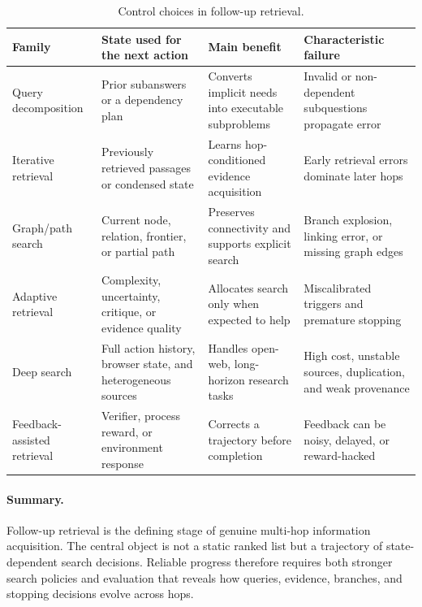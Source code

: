 \begin{table}[tbp]
\centering
\caption{Control choices in follow-up retrieval.}
\label{tab:followup_control}
\small
\begin{tabularx}{\textwidth}{@{}p{2.8cm}p{3.2cm}Y Y@{}}
\toprule
Family & State used for the next action & Main benefit & Characteristic failure \\
\midrule
Query decomposition & Prior subanswers or a dependency plan & Converts implicit needs into executable subproblems & Invalid or non-dependent subquestions propagate error \\
Iterative retrieval & Previously retrieved passages or condensed state & Learns hop-conditioned evidence acquisition & Early retrieval errors dominate later hops \\
Graph/path search & Current node, relation, frontier, or partial path & Preserves connectivity and supports explicit search & Branch explosion, linking error, or missing graph edges \\
Adaptive retrieval & Complexity, uncertainty, critique, or evidence quality & Allocates search only when expected to help & Miscalibrated triggers and premature stopping \\
Deep search & Full action history, browser state, and heterogeneous sources & Handles open-web, long-horizon research tasks & High cost, unstable sources, duplication, and weak provenance \\
Feedback-assisted retrieval & Verifier, process reward, or environment response & Corrects a trajectory before completion & Feedback can be noisy, delayed, or reward-hacked \\
\bottomrule
\end{tabularx}
\end{table}

\paragraph{Summary.}
Follow-up retrieval is the defining stage of genuine multi-hop information acquisition. The central object is not a static ranked list but a trajectory of state-dependent search decisions. Reliable progress therefore requires both stronger search policies and evaluation that reveals how queries, evidence, branches, and stopping decisions evolve across hops.
